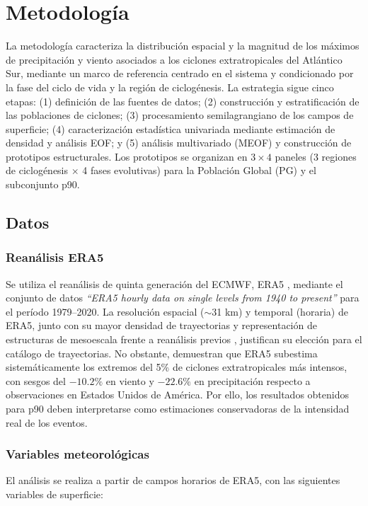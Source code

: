 \chapter{Metodología}\label{ch:metodologia}
La metodología caracteriza la distribución espacial y la magnitud de los máximos de precipitación y viento asociados a los ciclones extratropicales del Atlántico Sur, mediante un marco de referencia centrado en el sistema y condicionado por la fase del ciclo de vida y la región de ciclogénesis.
La estrategia sigue cinco etapas: (1) definición de las fuentes de datos; (2) construcción y estratificación de las poblaciones de ciclones; (3) procesamiento semilagrangiano de los campos de superficie; (4) caracterización estadística univariada mediante estimación de densidad y análisis EOF; y (5) análisis multivariado (MEOF) y construcción de prototipos estructurales.
Los prototipos se organizan en $3 \times 4$ paneles (3 regiones de ciclogénesis $\times$ 4 fases evolutivas) para la Población Global (PG) y el subconjunto p90.

\section{Datos}\label{sec:datos} 
\subsection{Reanálisis ERA5}\label{sec:datos_era5}
Se utiliza el reanálisis de quinta generación del ECMWF, ERA5 \citep{hersbach2020era5}, mediante el conjunto de datos \textit{``ERA5 hourly data on single levels from 1940 to present''} \citep{hersbach_era5_2023b} para el período 1979--2020.
La resolución espacial ($\sim$31 km) y temporal (horaria) de ERA5, junto con su mayor densidad de trayectorias y representación de estructuras de mesoescala frente a reanálisis previos \citep{gramcianinov2020analysis}, justifican su elección para el catálogo de trayectorias.
No obstante, \citet{chen2024evaluation} demuestran que ERA5 subestima sistemáticamente los extremos del 5\% de ciclones extratropicales más intensos, con sesgos del $-10.2\%$ en viento y $-22.6\%$ en precipitación respecto a observaciones en Estados Unidos de América.
Por ello, los resultados obtenidos para p90 deben interpretarse como estimaciones conservadoras de la intensidad real de los eventos.

\subsection{Variables meteorológicas}\label{subsec:variables}
El análisis se realiza a partir de campos horarios de ERA5, con las siguientes variables de superficie:

